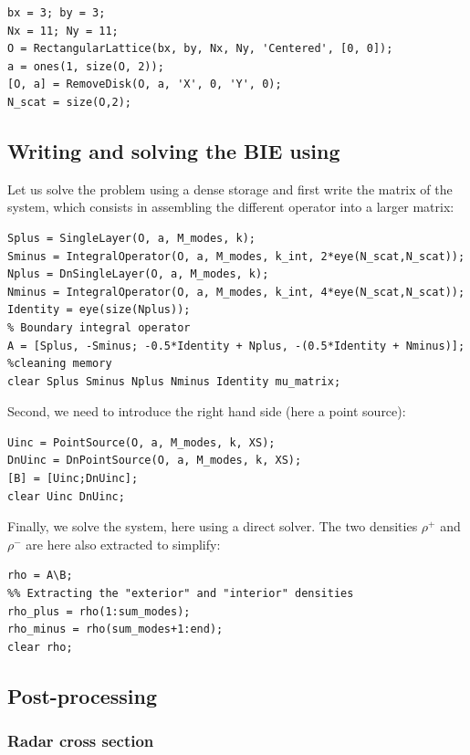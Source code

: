\begin{lstlisting}
bx = 3; by = 3;
Nx = 11; Ny = 11;
O = RectangularLattice(bx, by, Nx, Ny, 'Centered', [0, 0]);
a = ones(1, size(O, 2));
[O, a] = RemoveDisk(O, a, 'X', 0, 'Y', 0);
N_scat = size(O,2);
\end{lstlisting}

\subsection{Writing and solving the BIE using \mudiff}

Let us solve the problem using a dense storage and first write the matrix of the system, which consists in assembling the different operator into a larger matrix:

\begin{lstlisting}
Splus = SingleLayer(O, a, M_modes, k); 
Sminus = IntegralOperator(O, a, M_modes, k_int, 2*eye(N_scat,N_scat));
Nplus = DnSingleLayer(O, a, M_modes, k);
Nminus = IntegralOperator(O, a, M_modes, k_int, 4*eye(N_scat,N_scat));
Identity = eye(size(Nplus));
% Boundary integral operator
A = [Splus, -Sminus; -0.5*Identity + Nplus, -(0.5*Identity + Nminus)];
%cleaning memory
clear Splus Sminus Nplus Nminus Identity mu_matrix;
\end{lstlisting}

Second, we need to introduce the right hand side (here a point source):

\begin{lstlisting}
Uinc = PointSource(O, a, M_modes, k, XS);
DnUinc = DnPointSource(O, a, M_modes, k, XS);
[B] = [Uinc;DnUinc];
clear Uinc DnUinc;
\end{lstlisting}
Finally, we solve the system, here using a direct solver. The two densities $\rho^+$ and $\rho^-$ are here also extracted to simplify:
\begin{lstlisting}
rho = A\B;
%% Extracting the "exterior" and "interior" densities
rho_plus = rho(1:sum_modes);
rho_minus = rho(sum_modes+1:end);
clear rho;
\end{lstlisting}

\subsection{Post-processing}

\subsubsection{Radar cross section}

